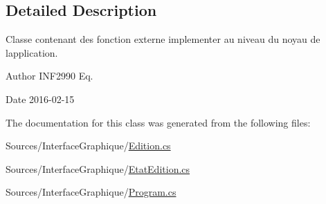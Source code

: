 \subsection{Detailed Description}
Classe contenant des fonction externe implementer au niveau du noyau de l\textquotesingle{}application. 

\begin{DoxyAuthor}{Author}
I\+N\+F2990 Eq. 
\end{DoxyAuthor}
\begin{DoxyDate}{Date}
2016-\/02-\/15 
\end{DoxyDate}


The documentation for this class was generated from the following files\+:\begin{DoxyCompactItemize}
\item 
Sources/\+Interface\+Graphique/\hyperlink{_edition_8cs}{Edition.\+cs}\item 
Sources/\+Interface\+Graphique/\hyperlink{_etat_edition_8cs}{Etat\+Edition.\+cs}\item 
Sources/\+Interface\+Graphique/\hyperlink{_program_8cs}{Program.\+cs}\end{DoxyCompactItemize}
